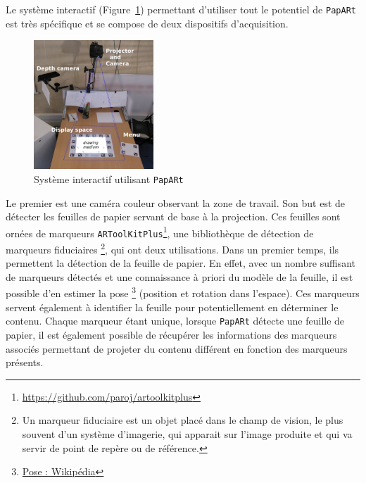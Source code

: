 Le système interactif (Figure~\ref{fig:papartsystem}) permettant d'utiliser tout le potentiel de \texttt{PapARt} est très spécifique et se compose de deux dispositifs d'acquisition.

\begin{figure}[H]
\centering
\includegraphics[width=0.4\textwidth]{images/papart-system}
\caption{Système interactif utilisant \texttt{PapARt}\protect\footnotemark}
\label{fig:papartsystem}
\end{figure}


Le premier est une caméra couleur observant la zone de travail. Son but est de détecter les feuilles de papier servant de base à la projection. Ces feuilles sont ornées de marqueurs \texttt{ARToolKitPlus}\footnote{\href{https://github.com/paroj/artoolkitplus}{https://github.com/paroj/artoolkitplus}}, une bibliothèque de détection de marqueurs fiduciaires \footnote{Un marqueur fiduciaire est un objet placé dans le champ de vision, le plus souvent d'un système d'imagerie, qui apparait sur l'image produite et qui va servir de point de repère ou de référence.}, qui ont deux utilisations. 
Dans un premier temps, ils permettent la détection de la feuille de papier. En effet, avec un nombre suffisant de marqueurs détectés et une connaissance à priori du modèle de la feuille, il est possible d'en estimer la pose \footnote{\href{https://en.wikipedia.org/wiki/Pose_(computer_vision)}{Pose : Wikipédia}} (position et rotation dans l'espace). 
Ces marqueurs servent également à identifier la feuille pour potentiellement en déterminer le contenu. Chaque marqueur étant unique, lorsque \texttt{PapARt} détecte une feuille de papier, il est également possible de récupérer les informations des marqueurs associés permettant de projeter du contenu différent en fonction des marqueurs présents.

